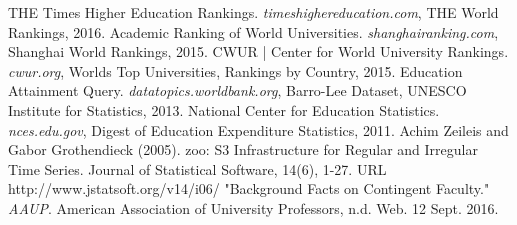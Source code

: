 \documentclass[12pt]{article}
\begin{document}
\begin{thebibliography}{9} 

 THE Times Higher Education Rankings. \textit{timeshighereducation.com}, THE World Rankings, 2016.
 Academic Ranking of World Universities. \textit{shanghairanking.com}, Shanghai World Rankings, 2015.
 CWUR | Center for World University Rankings. \textit{cwur.org}, Worlds Top Universities, Rankings by Country, 2015.
 Education Attainment Query. \textit{datatopics.worldbank.org}, Barro-Lee Dataset, UNESCO Institute for Statistics, 2013.
 National Center for Education Statistics. \textit{nces.edu.gov}, Digest of Education Expenditure Statistics, 2011.
 Achim Zeileis and Gabor Grothendieck (2005). zoo: S3 Infrastructure for Regular and Irregular Time Series. Journal of Statistical Software,
  14(6), 1-27. URL http://www.jstatsoft.org/v14/i06/
 "Background Facts on Contingent Faculty." \textit{AAUP}. American Association of University Professors, n.d. Web. 12 Sept. 2016.
\end{thebibliography} 
\end{document}
